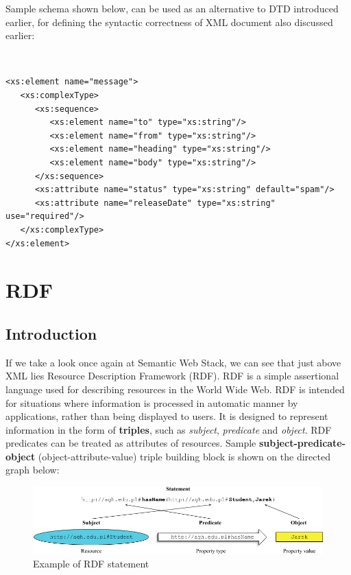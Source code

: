 \noindent Sample schema shown below, can be used as an alternative to DTD introduced earlier, for defining the syntactic correctness of XML document also discussed earlier:

{\tt \small
\begin{verbatim}
<xs:element name="message">
   <xs:complexType>
      <xs:sequence>
         <xs:element name="to" type="xs:string"/>
         <xs:element name="from" type="xs:string"/>
         <xs:element name="heading" type="xs:string"/>
         <xs:element name="body" type="xs:string"/>
      </xs:sequence>
      <xs:attribute name="status" type="xs:string" default="spam"/>
      <xs:attribute name="releaseDate" type="xs:string" use="required"/>
   </xs:complexType>
</xs:element>
\end{verbatim}
}

\section{RDF}
\label{sec:rdf}

\subsection{Introduction}
\label{sub:rdfIntroduction}

If we take a look once again at Semantic Web Stack, we can see that just above XML lies Resource Description Framework (RDF). RDF is a simple assertional language used for describing resources in the World Wide Web. RDF is intended for situations where information is processed in automatic manner by applications, rather than being displayed to users. It is designed to represent information in the form of \textbf{triples}, such as \textit{subject}, \textit{predicate} and \textit{object}. RDF predicates can be treated as attributes of resources. Sample \textbf{subject-predicate-object} (object-attribute-value) triple building block is shown on the directed graph below:

\medskip

\begin{figure}[htp]
\centering
\includegraphics[scale=0.72]{images/chapter2/RDFTriple}
\caption{Example of RDF statement}
\label{fig:rdfTriple}
\end{figure}

